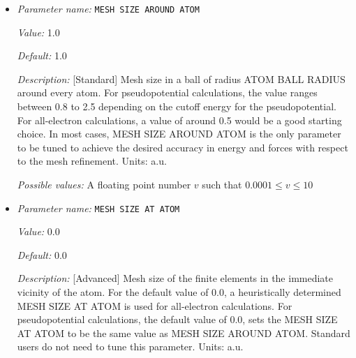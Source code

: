 \begin{itemize}
{\it Value:} false


{\it Default:} false


{\it Description:} [Developer] Generates adaptive mesh based on a-posteriori mesh adaption strategy using single atom wavefunctions before computing the ground-state. Default: false.


{\it Possible values:} A boolean value (true or false)
\item {\it Parameter name:} {\tt MESH SIZE AROUND ATOM}
\label{parameters:Finite element mesh parameters/Auto mesh generation parameters/MESH SIZE AROUND ATOM}
\label{parameters:Finite_20element_20mesh_20parameters/Auto_20mesh_20generation_20parameters/MESH_20SIZE_20AROUND_20ATOM}


{\it Value:} 1.0


{\it Default:} 1.0


{\it Description:} [Standard] Mesh size in a ball of radius ATOM BALL RADIUS around every atom. For pseudopotential calculations, the value ranges between 0.8 to 2.5 depending on the cutoff energy for the pseudopotential. For all-electron calculations, a value of around 0.5 would be a good starting choice. In most cases, MESH SIZE AROUND ATOM is the only parameter to be tuned to achieve the desired accuracy in energy and forces with respect to the mesh refinement. Units: a.u.


{\it Possible values:} A floating point number $v$ such that $0.0001 \leq v \leq 10$
\item {\it Parameter name:} {\tt MESH SIZE AT ATOM}
\label{parameters:Finite element mesh parameters/Auto mesh generation parameters/MESH SIZE AT ATOM}
\label{parameters:Finite_20element_20mesh_20parameters/Auto_20mesh_20generation_20parameters/MESH_20SIZE_20AT_20ATOM}


{\it Value:} 0.0


{\it Default:} 0.0


{\it Description:} [Advanced] Mesh size of the finite elements in the immediate vicinity of the atom. For the default value of 0.0, a heuristically determined MESH SIZE AT ATOM is used for all-electron calculations. For pseudopotential calculations, the default value of 0.0, sets the MESH SIZE AT ATOM to be the same value as MESH SIZE AROUND ATOM. Standard users do not need to tune this parameter. Units: a.u.



\end{itemize}
